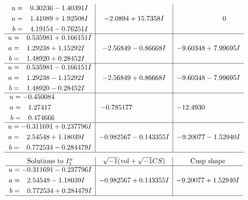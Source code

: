 \documentclass[1p]{elsarticle_modified}
\theoremstyle{definition}
\newcommand{\I}{\sqrt{-1}}
\begin{document}
$$\begin{array}{c|c|c}
\begin{aligned}
u &= \phantom{-}0.30236 - 1.40391 I \\
a &= \phantom{-}1.41089 + 1.92508 I \\
b &= \phantom{-}4.19154 - 0.76251 I\end{aligned}
 & -2.0894 + 15.7358 I & \phantom{-0.000000 } 0 \\ \hline\begin{aligned}
u &= \phantom{-}0.535981 + 0.166151 I \\
a &= \phantom{-}1.29238 + 1.15292 I \\
b &= \phantom{-}1.48920 + 0.28452 I\end{aligned}
 & -2.56849 - 0.86668 I & -9.60348 + 7.99695 I \\ \hline\begin{aligned}
u &= \phantom{-}0.535981 - 0.166151 I \\
a &= \phantom{-}1.29238 - 1.15292 I \\
b &= \phantom{-}1.48920 - 0.28452 I\end{aligned}
 & -2.56849 + 0.86668 I & -9.60348 - 7.99695 I \\ \hline\begin{aligned}
u &= -0.450084\phantom{ +0.000000I} \\
a &= \phantom{-}1.27417\phantom{ +0.000000I} \\
b &= \phantom{-}0.474666\phantom{ +0.000000I}\end{aligned}
 & -0.785177\phantom{ +0.000000I} & -12.4930\phantom{ +0.000000I} \\ \hline\begin{aligned}
u &= -0.311691 + 0.237796 I \\
a &= \phantom{-}2.54548 + 1.18039 I \\
b &= \phantom{-}0.772534 - 0.284479 I\end{aligned}
 & -0.982567 - 0.143355 I & -9.20077 - 1.52940 I\\
 \hline 
 \end{array}$$\newpage$$\begin{array}{c|c|c}  
\text{Solutions to }I^u_{1}& \I (\text{vol} + \sqrt{-1}CS) & \text{Cusp shape}\\
 \hline 
\begin{aligned}
u &= -0.311691 - 0.237796 I \\
a &= \phantom{-}2.54548 - 1.18039 I \\
b &= \phantom{-}0.772534 + 0.284479 I\end{aligned}
 & -0.982567 + 0.143355 I & -9.20077 + 1.52940 I\\
 \hline 
 \end{array}$$\newpage\newpage\renewcommand{\arraystretch}{1}
\end{document}
